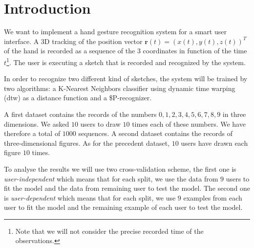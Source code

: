 \section{Introduction}

We want to implement a hand gesture recognition system for a smart user interface. A 3D tracking of the position vector $\bm{r}(t) = (x(t), y(t), z(t))^T$ of the hand is recorded as a sequence of the 3 coordinates in function of the time $t$\footnote{Note that we will not consider the precise recorded time of the observations.}. The user is executing a sketch that is recorded and recognized by the system.

In order to recognize two different kind of sketches, the system will be trained by two algorithms: a K-Nearest Neighbors classifier using dynamic time warping (dtw) as a distance function and a \$P-recognizer.

A first dataset contains the records of the numbers $0,1,2,3,4,5,6,7,8,9$ in three dimensions. We asked $10$ users to draw $10$ times each of these numbers. We have therefore a total of $1000$ sequences. A second dataset contains the records of three-dimensional figures. As for the precedent dataset, $10$ users have drawn each figure $10$ times.

To analyse the results we will use two cross-validation scheme, the first one is \textit{user-independent} which means that for each split, we use the data from $9$ users to fit the model and the data from remaining user to test the model. The second one is \textit{user-dependent} which means that for each split, we use $9$ examples from each user to fit the model and the remaining example of each user to test the model.